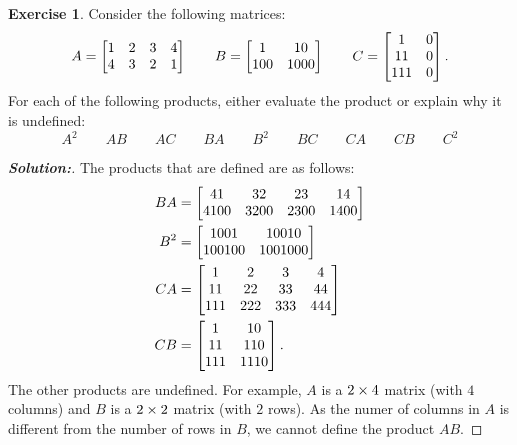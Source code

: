 \documentclass[a4paper]{amsart}
\theoremstyle{definition}
\newtheorem{exercise}{Exercise}
\newenvironment{solution}{\begin{proof}[\textbf{Solution:}] \vphantom{u}}{\end{proof}}
\begin{document}
\begin{exercise}\label{ex-mat-prod-ii}
 Consider the following matrices:
 \[ A = \left[\begin{matrix} 1&2&3&4 \\ 4&3&2&1 \end{matrix}\right] \qquad
    B = \left[\begin{matrix} 1 & 10 \\ 100 & 1000 \end{matrix}\right] \qquad
    C = \left[\begin{matrix} 1 & 0 \\ 11 & 0 \\ 111 & 0 \end{matrix}\right].
 \]
 For each of the following products, either evaluate the product or
 explain why it is undefined:
 \[ A^2 \qquad AB \qquad AC \qquad
    BA \qquad B^2 \qquad BC \qquad
    CA \qquad CB \qquad C^2
 \]
\end{exercise}
\begin{solution}
 The products that are defined are as follows:
 \begin{align*}
  BA &= \left[\begin{matrix} 41 & 32 & 23 & 14 \\ 4100 & 3200 & 2300 & 1400 \end{matrix}\right] \\
  B^2 &= \left[\begin{matrix} 1001 & 10010 \\ 100100 & 1001000 \end{matrix}\right] \\
  CA &= \left[\begin{matrix} 1 & 2 & 3 & 4 \\
             11 & 22 & 33 & 44 \\
             111 & 222 & 333 & 444 \end{matrix}\right] \\
  CB &= \left[\begin{matrix} 1 & 10 \\ 11 & 110 \\ 111 & 1110 \end{matrix}\right].
 \end{align*}
 The other products are undefined.  For example, $A$ is a $2\times 4$
 matrix (with $4$ columns) and $B$ is a $2\times 2$ matrix (with $2$
 rows).  As the numer of columns in $A$ is different from the number
 of rows in $B$, we cannot define the product $AB$.  
\end{solution}
\end{document}
